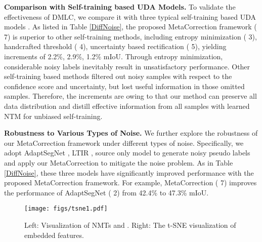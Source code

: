 \documentclass[final]{cvpr}
\begin{document}
\textbf{Comparison with Self-training based UDA Models.}
To validate the effectiveness of DMLC, we compare it with three typical self-training based UDA models \cite{zheng2020rectifying, zou2019confidence, zou2018unsupervised}. As listed in Table \ref{DiffNoise}, the proposed MetaCorrection framework ( 7) is superior to other self-training methods, including entropy minimization \cite{zou2019confidence} ( 3), handcrafted threshold  \cite{zou2018unsupervised} ( 4), uncertainty based rectification \cite{mei2020instance} ( 5), yielding increments of 2.2\%, 2.9\%, 1.2\% mIoU. Through entropy minimization, considerable noisy labels inevitably result in unsatisfactory performance. Other self-training based methods \cite{zou2019confidence, zou2018unsupervised} filtered out noisy samples with respect to the confidence score and uncertainty, but lost useful information in those omitted samples. Therefore, the increments are owing to that our method can preserve all data distribution and distill effective information from all samples with learned NTM for unbiased self-training. 

\textbf{Robustness to Various Types of Noise.}
We further explore the robustness of our MetaCorrection framework under different types of noise. Specifically, we adopt AdaptSegNet \cite{tsai2018learning}, LTIR \cite{kim2020learning}, source only model to generate noisy pseudo labels and apply our MetaCorrection to mitigate the noise problem. As in Table \ref{DiffNoise}, these three models have significantly improved performance with the proposed MetaCorrection framework. For example, MetaCorrection ( 7) improves the performance of AdaptSegNet ( 2) from 42.4\% to 47.3\% mIoU. 

\iffalse
\begin{figure}
\centering
\texttt{[image: figs/tsne.pdf]}
\caption{The t-SNE visualization of embedded features on the target domain. (a) Source only model, (b) Self-training based model \cite{zou2019confidence}, (c) Ours (MetaCorrection), (d) Oracle model.}
\label{fig:tsne}
\vspace{-0.4cm}
\end{figure}
\fi

\begin{figure}
\centering
\texttt{[image: figs/tsne1.pdf]}
\caption{Left: Visualization of NMTs  and . Right: The t-SNE visualization of embedded features.}
\label{fig:tsne}
\vspace{-0.4cm}
\end{figure}
\end{document}
